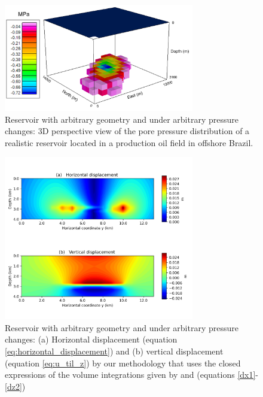 \documentclass[journal abbreviation, manuscript]{copernicus}
\begin{document}


\begin{figure}[h]
\includegraphics[width=8.3cm]{Fig/Figure_Pressure_complex_reservoir.png}
\caption{Reservoir with arbitrary geometry and under arbitrary pressure changes: 3D perspective view of the pore pressure distribution of a realistic reservoir 
located in a production oil field in offshore Brazil.}
\label{fig:pressure_complex_reservoir}
\end{figure}

\begin{figure}[h]
\includegraphics[width=8.3cm]{Fig/Figure_Displacement_complex_reservoir.png}
\caption{Reservoir with arbitrary geometry and under arbitrary pressure changes: (a) Horizontal displacement (equation \ref{eq:horizontal_displacement}) and (b) vertical displacement (equation \ref{eq:u_til_z}) by our methodology that uses the closed expressions of the volume integrations given by \cite{Nagyetal2000} and \cite{Nagyetal2002} (equations \ref{dx1}-\ref{dz2})}
\label{fig:displacement_complex_reservoir}
\end{figure}
\end{document}
